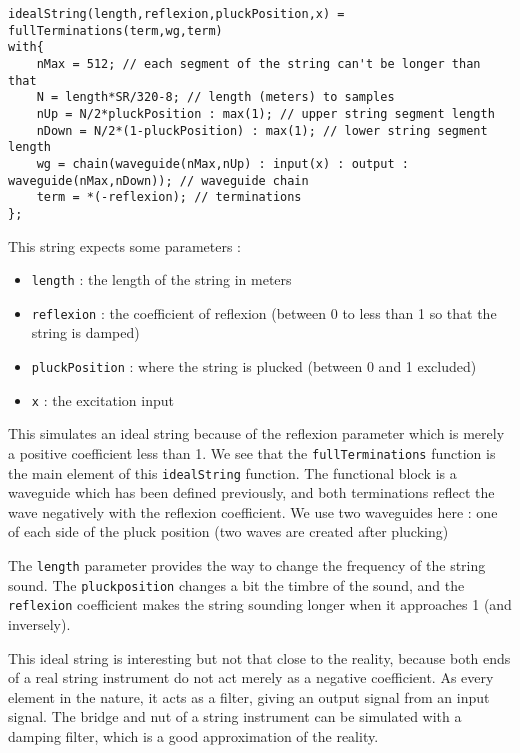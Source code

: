 \begin{lstlisting}
idealString(length,reflexion,pluckPosition,x) = fullTerminations(term,wg,term)
with{
	nMax = 512; // each segment of the string can't be longer than that
	N = length*SR/320-8; // length (meters) to samples
	nUp = N/2*pluckPosition : max(1); // upper string segment length
	nDown = N/2*(1-pluckPosition) : max(1); // lower string segment length
	wg = chain(waveguide(nMax,nUp) : input(x) : output : waveguide(nMax,nDown)); // waveguide chain
	term = *(-reflexion); // terminations
};
\end{lstlisting}

This string expects some parameters :
\begin{itemize}
    \item \texttt{length} : the length of the string in meters
    \item \texttt{reflexion} : the coefficient of reflexion (between 0 to less than 1 so that the string is damped)
    \item \texttt{pluckPosition} : where the string is plucked (between 0 and 1 excluded)
    \item \texttt{x} : the excitation input
\end{itemize}

This simulates an ideal string because of the reflexion parameter which is merely a positive coefficient less than 1.
We see that the \texttt{fullTerminations} function is the main element of this \texttt{idealString} function. The functional block is a waveguide which has been defined previously, and both terminations reflect the wave negatively with the reflexion coefficient. We use two waveguides here : one of each side of the pluck position (two waves are created after plucking)

The \texttt{length} parameter provides the way to change the frequency of the string sound. The \texttt{pluckposition} changes a bit the timbre of the sound, and the \texttt{reflexion} coefficient makes the string sounding longer when it approaches 1 (and inversely).

This ideal string is interesting but not that close to the reality, because both ends of a real string instrument do not act merely as a negative coefficient. As every element in the nature, it acts as a filter, giving an output signal from an input signal. The bridge and nut of a string instrument can be simulated with a damping filter, which is a good approximation of the reality.\\

